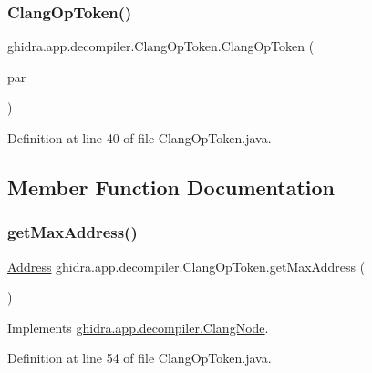 \subsubsection{\texorpdfstring{ClangOpToken()}{ClangOpToken()}}
{\footnotesize\ttfamily ghidra.\+app.\+decompiler.\+Clang\+Op\+Token.\+Clang\+Op\+Token (\begin{DoxyParamCaption}\item[{\mbox{\hyperlink{interfaceghidra_1_1app_1_1decompiler_1_1_clang_node}{Clang\+Node}}}]{par }\end{DoxyParamCaption})\hspace{0.3cm}{\ttfamily [inline]}}



Definition at line 40 of file Clang\+Op\+Token.\+java.



\subsection{Member Function Documentation}
\mbox{\label{classghidra_1_1app_1_1decompiler_1_1_clang_op_token_a843c0db9334c599560d97afaecbf62e1}} 
\subsubsection{\texorpdfstring{getMaxAddress()}{getMaxAddress()}}
{\footnotesize\ttfamily \mbox{\hyperlink{class_address}{Address}} ghidra.\+app.\+decompiler.\+Clang\+Op\+Token.\+get\+Max\+Address (\begin{DoxyParamCaption}{ }\end{DoxyParamCaption})\hspace{0.3cm}{\ttfamily [inline]}}



Implements \mbox{\hyperlink{interfaceghidra_1_1app_1_1decompiler_1_1_clang_node_a91e8beccce17b875e07d7c0747b43a97}{ghidra.\+app.\+decompiler.\+Clang\+Node}}.



Definition at line 54 of file Clang\+Op\+Token.\+java.

\mbox{\label{classghidra_1_1app_1_1decompiler_1_1_clang_op_token_ac5caf9ff72e305f37b06aa5228e176e4}} 
